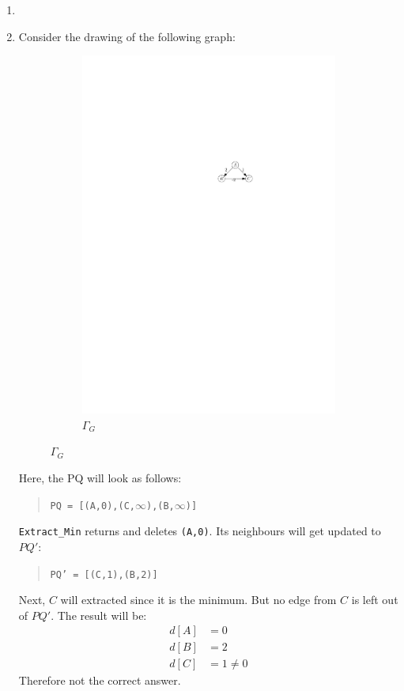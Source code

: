 \documentclass[a4paper,12pt,headsepline]{scrartcl}
\begin{document}
\begin{enumerate}
	\item 
	\item Consider the drawing of the following graph:
	\begin{figure}[H]
		\centering
		\begin{subfigure}{0.8\textwidth}
			\centering
			\includegraphics{22.pdf}
			\caption*{$\Gamma_G$}
		\end{subfigure}
	\end{figure}
	Here, the PQ will look as follows:
	\begin{quotation}
		\texttt{PQ = [(A,0),(C,$\infty$),(B,$\infty$)]}
	\end{quotation}
\texttt{Extract\_Min} returns and deletes \texttt{(A,0)}. Its neighbours will get updated to $PQ'$:
\begin{quotation}
	\texttt{PQ' = [(C,1),(B,2)]}
\end{quotation}
Next, $C$ will extracted since it is the minimum. But no edge from $C$ is left out of $PQ'$. The result will be:
\begin{align*}
	d[A] &= 0\\
	d[B] &= 2\\
	d[C] &= 1 \neq 0
\end{align*}
Therefore not the correct answer.
\end{enumerate}
\end{document}
